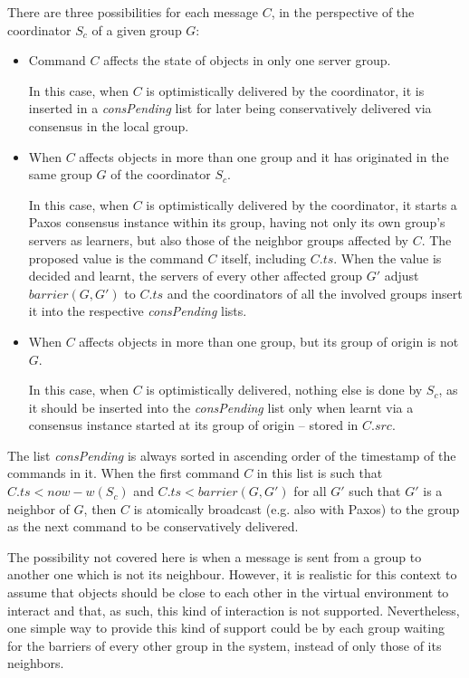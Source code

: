 \documentclass[times, 10pt]{article}
\begin{document}
There are three possibilities for each message $C$, in the perspective of the coordinator $S_c$ of a given group $G$:

\begin{itemize}
  \item Command $C$ affects the state of objects in only one server group.
  
  In this case, when $C$ is optimistically delivered by the coordinator, it is inserted in a \textit{consPending} list for later being conservatively delivered via consensus in the local group.

  \item When $C$ affects objects in more than one group and it has originated in the same group $G$ of the coordinator $S_c$.
  
  In this case, when $C$ is optimistically delivered by the coordinator, it starts a Paxos consensus instance within its group, having not only its own group's servers as learners, but also those of the neighbor groups affected by $C$. The proposed value is the command $C$ itself, including $C.ts$. When the value is decided and learnt, the servers of every other affected group $G'$ adjust $barrier(G, G')$ to $C.ts$ and the coordinators of all the involved groups insert it into the respective \textit{consPending} lists. 
  
  \item When $C$ affects objects in more than one group, but its group of origin is not $G$.
  
  In this case, when $C$ is optimistically delivered, nothing else is done by $S_c$, as it should be inserted into the \textit{consPending} list only when learnt via a consensus instance started at its group of origin -- stored in $C.src$.
\end{itemize}

The list \textit{consPending} is always sorted in ascending order of the timestamp of the commands in it. When the first command $C$ in this list is such that $C.ts < now - w(S_c)$ and $C.ts < barrier(G, G')$ for all $G'$ such that $G'$ is a neighbor of $G$, then $C$ is atomically broadcast (e.g. also with Paxos) to the group as the next command to be conservatively delivered. 

The possibility not covered here is when a message is sent from a group to another one which is not its neighbour. However, it is realistic for this context to assume that objects should be close to each other in the virtual environment to interact and that, as such, this kind of interaction is not supported. Nevertheless, one simple way to provide this kind of support could be by each group waiting for the barriers of every other group in the system, instead of only those of its neighbors.
\end{document}
